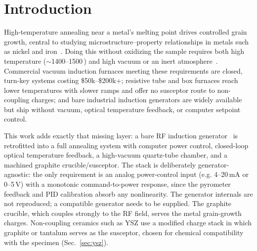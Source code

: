 \documentclass[%
 aip,
 rsi,%
 amsmath,amssymb,
 reprint,%
]{revtex4-2}
\newif\ifdraftnotes
\newcommand{\todo}[1]{\ifdraftnotes{\color{red}\textbf{[TODO: #1]}}\fi}
\begin{document}

\maketitle

\ifdraftnotes
\noindent\fbox{\parbox{\linewidth}{\small\textbf{Status:} working draft
condensed to the 5-page limit; the removed figures and extended detail are in
the supplementary material. \todo{}-marked items flag values that still need
to be confirmed before submission.}}
\fi

\section{Introduction}

High-temperature annealing near a metal's melting point drives controlled
grain growth, central to studying microstructure--property relationships in
metals such as nickel and
iron~\cite{liu2021studyofgrain,mohrbacher2026applicationofmicroalloying,alogab2007theinfluenceof,tian2009experimentalandsimulation,moore2017graincoarseningbehaviour}.
Doing this without oxidizing the sample requires both high temperature
($\sim$1400--1500\,\celsius) and high vacuum or an inert
atmosphere~\cite{zhornyak1982reductionanddecarburization,muramatsu2005gascontaminationdue}.
Commercial vacuum induction furnaces meeting these requirements are closed,
turn-key systems costing \$50k--\$200k+; resistive tube and box furnaces reach
lower temperatures with slower ramps and offer no susceptor route to
non-coupling charges; and bare industrial induction generators are widely
available but ship without vacuum, optical temperature feedback, or computer
setpoint control.

This work adds exactly that missing layer: a bare RF induction
generator~\cite{rudnev2017handbookofinduction,lucia2014inductionheatingtechnology}
is retrofitted into a full annealing system with computer power control,
closed-loop optical temperature feedback, a high-vacuum quartz-tube chamber,
and a machined graphite crucible/susceptor. The stack is deliberately
generator-agnostic: the only requirement is an analog power-control input
(e.g. 4--20\,mA or 0--5\,V) with a monotonic command-to-power
response, since the pyrometer feedback and PID calibration absorb any
nonlinearity. The generator internals are not reproduced; a compatible
generator needs to be supplied. The graphite
crucible, which couples strongly to the RF field, serves the metal
grain-growth charges. Non-coupling ceramics such as YSZ use a modified charge
stack in which graphite or tantalum serves as the susceptor, chosen for
chemical compatibility with the specimen (Sec.~\ref{sec:ysz}).
\end{document}
